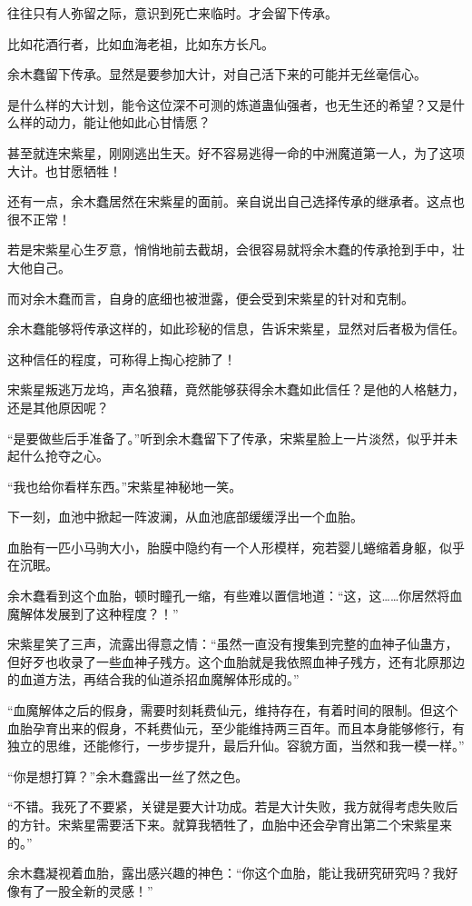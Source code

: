 \begin{this_body}
往往只有人弥留之际，意识到死亡来临时。才会留下传承。

比如花酒行者，比如血海老祖，比如东方长凡。

余木蠢留下传承。显然是要参加大计，对自己活下来的可能并无丝毫信心。

是什么样的大计划，能令这位深不可测的炼道蛊仙强者，也无生还的希望？又是什么样的动力，能让他如此心甘情愿？

甚至就连宋紫星，刚刚逃出生天。好不容易逃得一命的中洲魔道第一人，为了这项大计。也甘愿牺牲！

还有一点，余木蠢居然在宋紫星的面前。亲自说出自己选择传承的继承者。这点也很不正常！

若是宋紫星心生歹意，悄悄地前去截胡，会很容易就将余木蠢的传承抢到手中，壮大他自己。

而对余木蠢而言，自身的底细也被泄露，便会受到宋紫星的针对和克制。

余木蠢能够将传承这样的，如此珍秘的信息，告诉宋紫星，显然对后者极为信任。

这种信任的程度，可称得上掏心挖肺了！

宋紫星叛逃万龙坞，声名狼藉，竟然能够获得余木蠢如此信任？是他的人格魅力，还是其他原因呢？

“是要做些后手准备了。”听到余木蠢留下了传承，宋紫星脸上一片淡然，似乎并未起什么抢夺之心。

“我也给你看样东西。”宋紫星神秘地一笑。

下一刻，血池中掀起一阵波澜，从血池底部缓缓浮出一个血胎。

血胎有一匹小马驹大小，胎膜中隐约有一个人形模样，宛若婴儿蜷缩着身躯，似乎在沉眠。

余木蠢看到这个血胎，顿时瞳孔一缩，有些难以置信地道：“这，这……你居然将血魔解体发展到了这种程度？！”

宋紫星笑了三声，流露出得意之情：“虽然一直没有搜集到完整的血神子仙蛊方，但好歹也收录了一些血神子残方。这个血胎就是我依照血神子残方，还有北原那边的血道方法，再结合我的仙道杀招血魔解体形成的。”

“血魔解体之后的假身，需要时刻耗费仙元，维持存在，有着时间的限制。但这个血胎孕育出来的假身，不耗费仙元，至少能维持两三百年。而且本身能够修行，有独立的思维，还能修行，一步步提升，最后升仙。容貌方面，当然和我一模一样。”

“你是想打算？”余木蠢露出一丝了然之色。

“不错。我死了不要紧，关键是要大计功成。若是大计失败，我方就得考虑失败后的方针。宋紫星需要活下来。就算我牺牲了，血胎中还会孕育出第二个宋紫星来的。”

余木蠢凝视着血胎，露出感兴趣的神色：“你这个血胎，能让我研究研究吗？我好像有了一股全新的灵感！”


\end{this_body}
